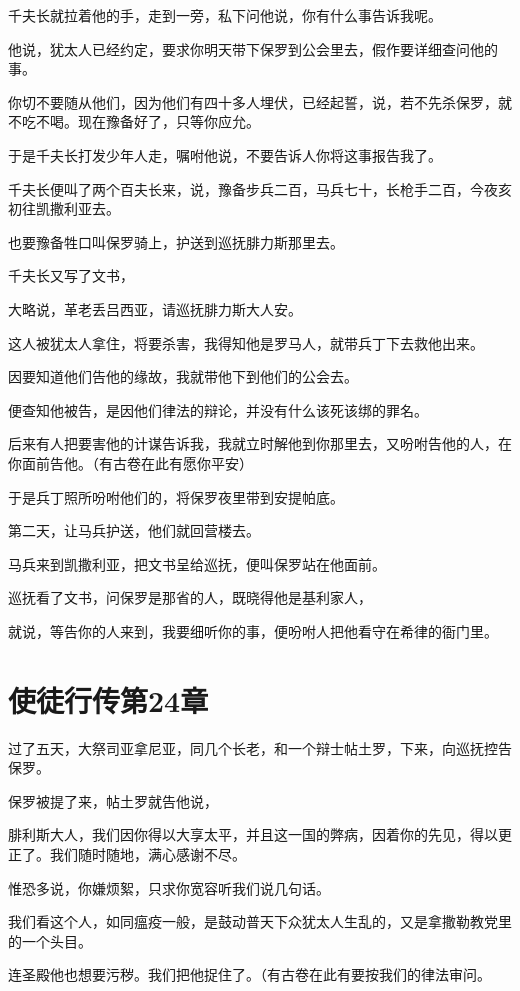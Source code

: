 \documentclass[12pt,oneside]{book}
\begin{document}
千夫长就拉着他的手，走到一旁，私下问他说，你有什么事告诉我呢。

他说，犹太人已经约定，要求你明天带下保罗到公会里去，假作要详细查问他的事。

你切不要随从他们，因为他们有四十多人埋伏，已经起誓，说，若不先杀保罗，就不吃不喝。现在豫备好了，只等你应允。

于是千夫长打发少年人走，嘱咐他说，不要告诉人你将这事报告我了。

千夫长便叫了两个百夫长来，说，豫备步兵二百，马兵七十，长枪手二百，今夜亥初往凯撒利亚去。

也要豫备牲口叫保罗骑上，护送到巡抚腓力斯那里去。

千夫长又写了文书，

大略说，革老丢吕西亚，请巡抚腓力斯大人安。

这人被犹太人拿住，将要杀害，我得知他是罗马人，就带兵丁下去救他出来。

因要知道他们告他的缘故，我就带他下到他们的公会去。

便查知他被告，是因他们律法的辩论，并没有什么该死该绑的罪名。

后来有人把要害他的计谋告诉我，我就立时解他到你那里去，又吩咐告他的人，在你面前告他。（有古卷在此有愿你平安）

于是兵丁照所吩咐他们的，将保罗夜里带到安提帕底。

第二天，让马兵护送，他们就回营楼去。

马兵来到凯撒利亚，把文书呈给巡抚，便叫保罗站在他面前。

巡抚看了文书，问保罗是那省的人，既晓得他是基利家人，

就说，等告你的人来到，我要细听你的事，便吩咐人把他看守在希律的衙门里。

\chapter{使徒行传第24章}
过了五天，大祭司亚拿尼亚，同几个长老，和一个辩士帖土罗，下来，向巡抚控告保罗。

保罗被提了来，帖土罗就告他说，

腓利斯大人，我们因你得以大享太平，并且这一国的弊病，因着你的先见，得以更正了。我们随时随地，满心感谢不尽。

惟恐多说，你嫌烦絮，只求你宽容听我们说几句话。

我们看这个人，如同瘟疫一般，是鼓动普天下众犹太人生乱的，又是拿撒勒教党里的一个头目。

连圣殿他也想要污秽。我们把他捉住了。（有古卷在此有要按我们的律法审问。
\end{document}
